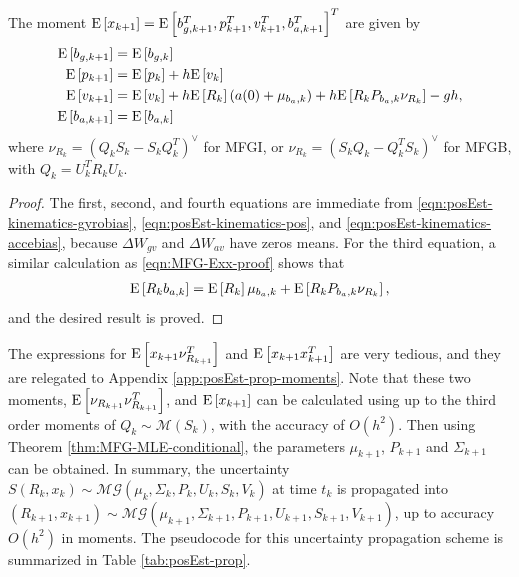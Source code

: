 \begin{theorem} \label{thm:posEst-prop-Ex}
	The moment $\mathrm{E}\left[ x_{k+1} \right] = \mathrm{E}\left[  b_{g,k+1}^T, p_{k+1}^T, v_{k+1}^T, b_{a,k+1}^T \right]^T$ are given by
	\begin{align}
		\mathrm{E}\left[ b_{g,k+1} \right] &= \mathrm{E}\left[ b_{g,k} \right] \\
		\mathrm{E}\left[ p_{k+1} \right] &= \mathrm{E}\left[ p_k \right] + h\mathrm{E}\left[ v_k \right] \\
		\mathrm{E}\left[ v_{k+1} \right] &= \mathrm{E}\left[ v_k \right] + h\mathrm{E}\left[ R_k \right](a(0)+\mu_{b_a,k}) + h\mathrm{E}\left[ R_kP_{b_a,k}\nu_{R_k} \right] - gh, \\
		\mathrm{E}\left[ b_{a,k+1} \right] &= \mathrm{E}\left[ b_{a,k} \right]
	\end{align}
	where $\nu_{R_k} = (Q_kS_k-S_kQ_k^T)^\vee$ for MFGI, or $\nu_{R_k} = (S_kQ_k-Q_k^TS_k)^\vee$ for MFGB, with $Q_k = U_k^TR_kU_k$.
\end{theorem}
\begin{proof}
	The first, second, and fourth equations are immediate from \eqref{eqn:posEst-kinematics-gyrobias}, \eqref{eqn:posEst-kinematics-pos}, and \eqref{eqn:posEst-kinematics-accebias}, because $\Delta W_{gv}$ and $\Delta W_{av}$ have zeros means.
	For the third equation, a similar calculation as \eqref{eqn:MFG-Exx-proof} shows that
	\begin{align*}
		\mathrm{E}\left[ R_kb_{a,k} \right] = \mathrm{E}\left[ R_k \right]\mu_{b_a,k} + \mathrm{E}\left[ R_kP_{b_a,k}\nu_{R_k} \right],
	\end{align*}
	and the desired result is proved.
\end{proof}

The expressions for $\mathrm{E}\left[ x_{k+1}\nu_{R_{k+1}}^T \right]$ and $\mathrm{E}\left[ x_{k+1}x_{k+1}^T \right]$ are very tedious, and they are relegated to Appendix \ref{app:posEst-prop-moments}.
Note that these two moments, $\mathrm{E}\left[ \nu_{R_{k+1}}\nu_{R_{k+1}}^T \right]$, and $\mathrm{E}\left[ x_{k+1} \right]$ can be calculated using up to the third order moments of $Q_k\sim\mathcal{M}(S_k)$, with the accuracy of $O(h^2)$.
Then using Theorem \ref{thm:MFG-MLE-conditional}, the parameters $\mu_{k+1}$, $P_{k+1}$ and $\Sigma_{k+1}$ can be obtained.
In summary, the uncertainty $S(R_k,x_k) \sim \mathcal{MG}(\mu_k, \Sigma_k, P_k, U_k, S_k, V_k)$ at time $t_k$ is propagated into $(R_{k+1},x_{k+1}) \sim \mathcal{MG}(\mu_{k+1},\allowbreak \Sigma_{k+1},\allowbreak P_{k+1},\allowbreak U_{k+1},\allowbreak S_{k+1},\allowbreak V_{k+1})$, up to accuracy $O(h^2)$ in moments.
The pseudocode for this uncertainty propagation scheme is summarized in Table \ref{tab:posEst-prop}.

